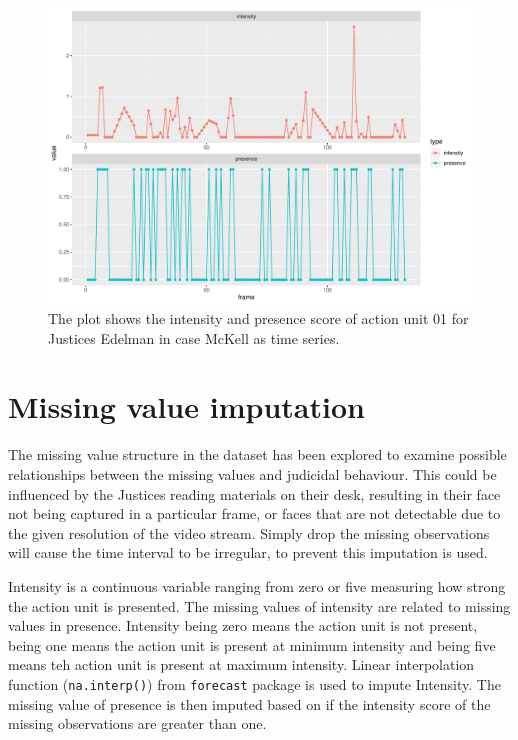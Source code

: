 \documentclass{monashthesis}
\begin{document}
\begin{figure}

{\centering \includegraphics[width=1\linewidth]{figures/ts-plot-1} 

}

\caption{The plot shows the intensity and presence score of action unit 01 for Justices Edelman in case McKell as time series.}\label{fig:ts-plot}
\end{figure}

\hypertarget{missing-value-imputation}{%
\section{Missing value imputation}\label{missing-value-imputation}}

The missing value structure in the dataset has been explored to examine possible relationships between the missing values and judicidal behaviour.
This could be influenced by the Justices reading materials on their desk, resulting in their face not being captured in a particular frame, or faces that are not detectable due to the given resolution of the video stream.
Simply drop the missing observations will cause the time interval to be irregular, to prevent this imputation is used.

Intensity is a continuous variable ranging from zero or five measuring how strong the action unit is presented. The missing values of intensity are related to missing values in presence. Intensity being zero means the action unit is not present, being one means the action unit is present at minimum intensity and being five means teh action unit is present at maximum intensity. Linear interpolation function (\texttt{na.interp()}) from \texttt{forecast} package is used to impute Intensity. The missing value of presence is then imputed based on if the intensity score of the missing observations are greater than one.
\end{document}
